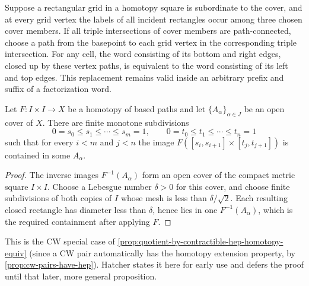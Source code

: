 %
%

\begin{lemma}
\label{lem:van-kampen-grid-cell-sweep}


Suppose a rectangular grid in a homotopy square is subordinate to the cover,
and at every grid vertex the labels of all incident rectangles occur among
three chosen cover members.  If all triple intersections of cover members
are path-connected, choose a path from the basepoint to each grid vertex in
the corresponding triple intersection.  For any cell, the word consisting
of its bottom and right edges, closed up by these vertex paths, is equivalent
to the word consisting of its left and top edges.  This replacement remains
valid inside an arbitrary prefix and suffix of a factorization word.
\end{lemma}

\begin{lemma}
\label{lem:van-kampen-rectangular-subdivision}


Let $F:I\times I\to X$ be a homotopy of based paths and let
$\{A_\alpha\}_{\alpha\in J}$ be an open cover of $X$. There are finite monotone
subdivisions
\[
0=s_0\leq s_1\leq\cdots\leq s_m=1,
\qquad
0=t_0\leq t_1\leq\cdots\leq t_n=1
\]
such that for every $i<m$ and $j<n$ the image
$F([s_i,s_{i+1}]\times[t_j,t_{j+1}])$ is contained in some $A_\alpha$.
\end{lemma}
\begin{proof}
The inverse images $F^{-1}(A_\alpha)$ form an open cover of the compact metric
square $I\times I$. Choose a Lebesgue number $\delta>0$ for this cover, and choose
finite subdivisions of both copies of $I$ whose mesh is less than
$\delta/\sqrt 2$. Each resulting closed rectangle has diameter less than
$\delta$, hence lies in one $F^{-1}(A_\alpha)$, which is the required
containment after applying $F$.
\end{proof}

\begin{remark}
\label{rem:collapsing-contractible-cw-subcomplex-special-case}
This is the CW special case of \cref{prop:quotient-by-contractible-hep-homotopy-equiv}
(since a CW pair automatically has the homotopy extension property, by
\cref{prop:cw-pairs-have-hep}). Hatcher states it here for early use and defers the
proof until that later, more general proposition.
\end{remark}
